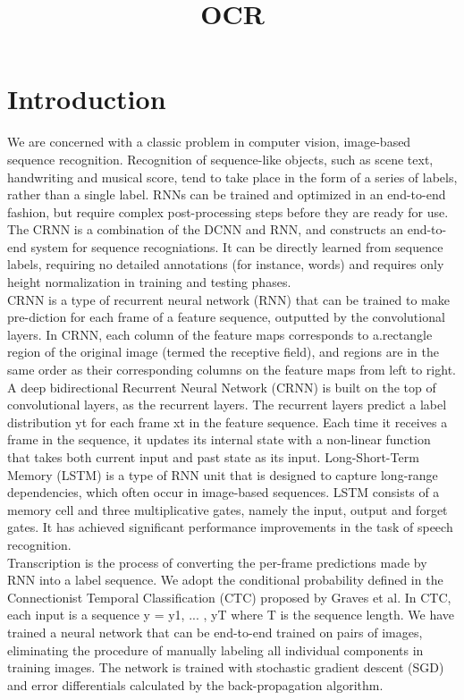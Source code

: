 \documentclass{article}
\title{OCR}
\begin{document}
\maketitle

\section{Introduction}


We are concerned with a classic problem in computer vision, image-based sequence recognition. Recognition of sequence-like objects, such as scene text, handwriting and musical score, tend to take place in the form of a series of labels, rather than a single label. RNNs can be trained and optimized in an end-to-end fashion, but require complex post-processing steps before they are ready for use. The CRNN is a combination of the DCNN and RNN, and constructs an end-to-end system for sequence recogniations. It can be directly learned from sequence labels, requiring no detailed annotations (for instance, words) and requires only height normalization in training and testing phases.\\

CRNN is a type of recurrent neural network (RNN) that can be trained to make pre-diction for each frame of a feature sequence, outputted by the convolutional layers. In CRNN, each column of the feature maps corresponds to a.rectangle region of the original image (termed the receptive field), and regions are in the same order as their corresponding columns on the feature maps from left to right. A deep bidirectional Recurrent Neural Network (CRNN) is built on the top of convolutional layers, as the recurrent layers.
The recurrent layers predict a label distribution yt for each frame xt in the feature sequence. Each time it receives a frame in the sequence, it updates its internal state with a non-linear function that takes both current input and past state as its input. Long-Short-Term Memory (LSTM) is a type of RNN unit that is designed to capture long-range dependencies, which often occur in image-based sequences. LSTM consists of a memory cell and three multiplicative gates, namely the input, output and forget gates. It has achieved significant performance improvements in the task of speech recognition.\\

Transcription is the process of converting the per-frame predictions made by RNN into a label sequence. We adopt the conditional probability defined in the Connectionist Temporal Classification (CTC) proposed by Graves et al. In CTC, each input is a sequence y = y1, ... , yT where T is the sequence length.
We have trained a neural network that can be end-to-end trained on pairs of images, eliminating the procedure of manually labeling all individual components in training images. The network is trained with stochastic gradient descent (SGD) and error differentials calculated by the back-propagation algorithm.\\
\end{document}
